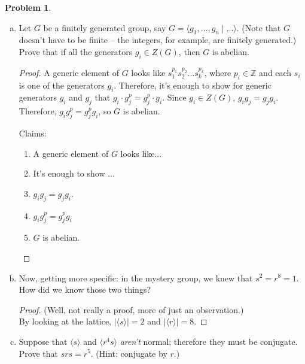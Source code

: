 \documentclass[12pt]{article}
\theoremstyle{definition} %
\newtheorem{problem}{Problem}
\newcommand{\Z}{\mathbb{Z}}
\def\<{\langle}
\def\>{\rangle}
\begin{document}
\begin{problem}
\begin{enumerate}[(a)]
\begin{proof}
            Claims:
            \begin{enumerate}[(1)]
                \item A generic element of $G$ looks like...
                \item It's enough to show that...
                \item $hg = gh$
                \item $hg^p = g^ph$
                \item $h\in Z(G)$
            \end{enumerate}
        \end{proof}
        \item Let $G$ be a finitely generated group, say $G = \<g_1, \ldots, g_n \mid \ldots\>$. (Note that $G$ doesn't have to be finite -- the integers, for example, are finitely generated.) Prove that if all the generators $g_i \in Z(G)$, then $G$ is abelian.
        \begin{proof}
            A generic element of $G$ looks like $s_1^{p_1} s_2^{p_2} \ldots s_k^{p_k}$, where $p_i \in \Z$ and each $s_i$ is one of the generators $g_i$. Therefore, it's enough to show for generic generators $g_i$ and $g_j$ that $g_i \cdot g_j^p = g_j^p \cdot g_i$. Since $g_i \in Z(G)$, $g_i g_j = g_j g_i$. Therefore, $g_i g_j^p = g_j^p g_i$, so $G$ is abelian.

            Claims:
            \begin{enumerate}[(1)]
                \item A generic element of $G$ looks like...
                \item It's enough to show ...
                \item $g_i g_j = g_j g_i$. 
                \item $g_i g_j^p = g_j^p g_i$
                \item $G$ is abelian.
            \end{enumerate}
        \end{proof}
        \item Now, getting more specific: in the mystery group, we knew that $s^2 = r^8 = 1$. How did we know those two things?

        \begin{proof}
            (Well, not really a proof, more of just an observation.) \\
            By looking at the lattice, $|\<s\>| = 2$ and $|\<r\>| = 8$.
        \end{proof}
        \item Suppose that $\<s\>$ and $\<r^4s\>$ \textit{aren't} normal; therefore they must be conjugate. Prove that $srs = r^5$. (Hint: conjugate by $r$.)


\end{enumerate}
\end{problem}
\end{document}
